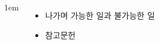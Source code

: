\documentclass[	14pt, 
							a1paper, 
							portrait, %
							margin=0mm, %
							innermargin=10mm,  		%
							colspace=5mm, 
							subcolspace=0mm
							]{tikzposter}
\begin{document}
\begin{columns}
{\begin{itemize}
					\end{itemize}
			}





			{
					\setlength{\leftmargini}{2em}
					\setlength{\labelsep} {1em}
					\begin{itemize}

					\item 나가며  가능한 일과 불가능한 일
					\item 참고문헌
					\end{itemize}
			} %



	\end{columns}
\end{document}
